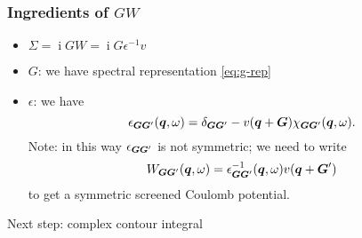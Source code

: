 \documentclass[t]{beamer}
\DeclareMathOperator{\ii}{i}
\begin{document}
\begin{frame}
\frametitle{Ingredients of $GW$}

\begin{itemize}
    \item $\Sigma = \ii GW = \ii G \epsilon^{-1} v$
    \item $G$: we have spectral representation \eqref{eq:g-rep}
    \item $\epsilon$: we have 
        \begin{equation}
            \epsilon_{\vb*{G} \vb*{G}'}(\vb*{q}, \omega) = 
            \delta_{\vb*{G} \vb*{G}'} - v(\vb*{q} + \vb*{G}) \chi_{\vb*{G} \vb*{G}'}(\vb*{q}, \omega) .
        \end{equation}
        Note: in this way $\epsilon_{\vb*{G} \vb*{G}'}$ is not symmetric; 
        we need to write 
        \begin{equation}
            W_{\vb*{G} \vb*{G}'} (\vb*{q}, \omega)
            = \epsilon^{-1}_{\vb*{G} \vb*{G}'} (\vb*{q}, \omega) v(\vb*{q} + \vb*{G}') 
        \end{equation}
        to get a symmetric screened Coulomb potential.
\end{itemize}    

Next step: complex contour integral

\end{frame}
\end{document}
